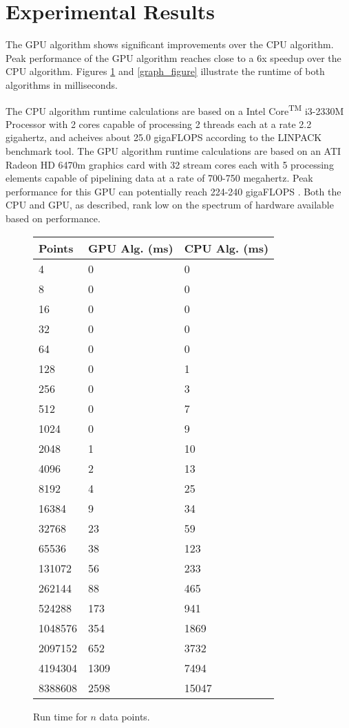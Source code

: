 \documentclass{article}
\begin{document}
\section{Experimental Results}

The GPU algorithm shows significant improvements over the CPU algorithm. Peak performance of the GPU algorithm reaches close to a 6x speedup over the CPU algorithm. Figures \ref{chart_figure} and \ref{graph_figure} illustrate the runtime of both algorithms in milliseconds.

The CPU algorithm runtime calculations are based on a Intel \textsuperscript{\textregistered} Core\textsuperscript{TM} i3-2330M Processor with 2 cores capable of processing 2 threads each at a rate 2.2 gigahertz, and acheives about 25.0 gigaFLOPS according to the LINPACK benchmark tool. The GPU algorithm runtime calculations are based on an ATI Radeon HD 6470m graphics card with 32 stream cores each with 5 processing elements capable of pipelining data at a rate of 700-750 megahertz. Peak performance for this GPU can potentially reach 224-240 gigaFLOPS \cite{amdspecs}. Both the CPU and GPU, as described, rank low on the spectrum of hardware available based on performance.

\begin{figure}
\centering
\begin{tabular}{|l|l|l|}
    \hline
    Points & GPU Alg. (ms) & CPU Alg. (ms) \\ \hline
    4 & 0 & 0 \\ 
    8 & 0 & 0 \\ 
    16 & 0 & 0 \\ 
    32 & 0 & 0 \\ 
    64 & 0 & 0 \\ 
    128 & 0 & 1 \\ 
    256 & 0 & 3 \\ 
    512 & 0 & 7 \\ 
    1024 & 0 & 9 \\ 
    2048 & 1 & 10 \\ 
    4096 & 2 & 13 \\ 
    8192 & 4 & 25 \\ 
    16384 & 9 & 34 \\ 
    32768 & 23 & 59 \\ 
    65536 & 38 & 123 \\
    131072 & 56 & 233 \\ 
    262144 & 88 & 465 \\ 
    524288 & 173 & 941 \\
    1048576 & 354 & 1869 \\ 
    2097152 & 652 & 3732 \\ 
    4194304 & 1309 & 7494 \\ 
    8388608 & 2598 & 15047 \\
    \hline
  \end{tabular}
\caption{Run time for $n$ data points.}
\label{chart_figure}
\end{figure}
\end{document}
